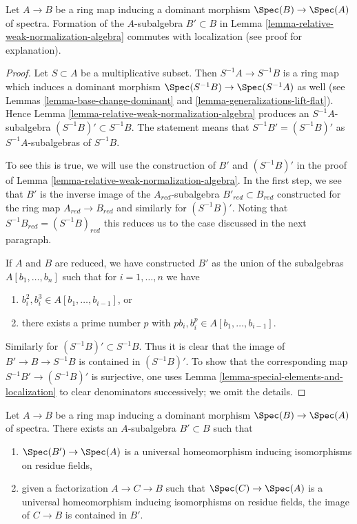 \begin{lemma}
\label{lemma-relative-weak-normalization-localization}
Let $A \to B$ be a ring map inducing a dominant morphism
$\Spec(B) \to \Spec(A)$ of spectra. Formation of the $A$-subalgebra
$B' \subset B$ in Lemma \ref{lemma-relative-weak-normalization-algebra}
commutes with localization (see proof for explanation).
\end{lemma}

\begin{proof}
Let $S \subset A$ be a multiplicative subset. Then $S^{-1}A \to S^{-1}B$ is a
ring map which induces a dominant morphism $\Spec(S^{-1}B) \to \Spec(S^{-1}A)$
as well (see Lemmas \ref{lemma-base-change-dominant} and
\ref{lemma-generalizations-lift-flat}).
Hence Lemma \ref{lemma-relative-weak-normalization-algebra}
produces an $S^{-1}A$-subalgebra $(S^{-1}B)' \subset S^{-1}B$.
The statement means that $S^{-1}B' = (S^{-1}B)'$ as $S^{-1}A$-subalgebras
of $S^{-1}B$.

\medskip\noindent
To see this is true, we will use the construction of $B'$ and
$(S^{-1}B)'$ in the proof of
Lemma \ref{lemma-relative-weak-normalization-algebra}.
In the first step, we see that $B'$ is the inverse image of
the $A_{red}$-subalgebra $B'_{red} \subset B_{red}$ constructed
for the ring map $A_{red} \to B_{red}$ and similarly for $(S^{-1}B)'$.
Noting that $S^{-1}B_{red} = (S^{-1}B)_{red}$ this reduces
us to the case discussed in the next paragraph.

\medskip\noindent
If $A$ and $B$ are reduced, we have constructed $B'$ as the union
of the subalgebras $A[b_1, \ldots, b_n]$ such that for $i = 1, \ldots, n$
we have
\begin{enumerate}
\item $b_i^2, b_i^3 \in A[b_1, \ldots, b_{i - 1}]$, or
\item there exists a prime number $p$ with
$pb_i, b_i^p \in A[b_1, \ldots, b_{i - 1}]$.
\end{enumerate}
Similarly for $(S^{-1}B)' \subset S^{-1}B$. Thus it is clear that the
image of $B' \to B \to S^{-1}B$ is contained in $(S^{-1}B)'$.
To show that the corresponding map $S^{-1}B' \to (S^{-1}B)'$
is surjective, one uses Lemma \ref{lemma-special-elements-and-localization}
to clear denominators successively; we omit the details.
\end{proof}

\begin{lemma}
\label{lemma-relative-seminormalization-algebra}
Let $A \to B$ be a ring map inducing a dominant morphism
$\Spec(B) \to \Spec(A)$ of spectra. There exists an $A$-subalgebra
$B' \subset B$ such that
\begin{enumerate}
\item $\Spec(B') \to \Spec(A)$ is a universal homeomorphism inducing
isomorphisms on residue fields,
\item given a factorization $A \to C \to B$ such that $\Spec(C) \to \Spec(A)$
is a universal homeomorphism inducing isomorphisms on residue fields,
the image of $C \to B$ is contained in $B'$.
\end{enumerate}
\end{lemma}

